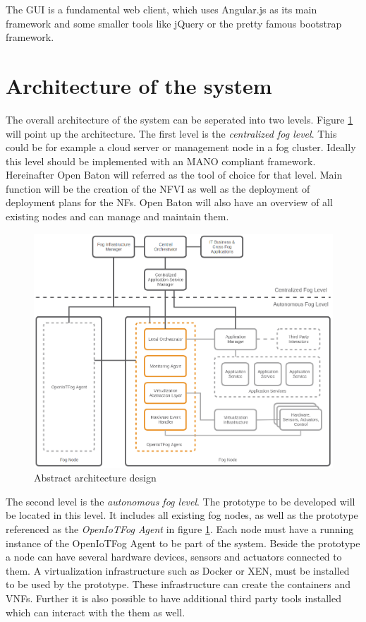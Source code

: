 The \ac{GUI} is a fundamental web client, which uses Angular.js as its main framework and some smaller tools like jQuery or the pretty famous bootstrap framework.

\section{Architecture of the system}
\doit

The overall architecture of the system can be seperated into two levels.
Figure \ref{fig:abstract_architecture_design} will point up the architecture.
The first level is the \textit{centralized fog level}.
This could be for example a cloud server or management node in a fog cluster.
Ideally this level should be implemented with an \ac{MANO} compliant framework.
Hereinafter Open Baton will referred as the tool of choice for that level.
Main function will be the creation of the \ac{NFVI} as well as the deployment of deployment plans for the \acp{NF}.
Open Baton will also have an overview of all existing nodes and can manage and maintain them.

\begin{figure}[H]
    \centering
    \includegraphics[width=\textwidth]{resources/images/initial_structure.png}
    \caption[Abstract architecture design]{Abstract architecture design}
    \label{fig:abstract_architecture_design}
\end{figure}

The second level is the \textit{autonomous fog level}.
The prototype to be developed will be located in this level.
It includes all existing fog nodes, as well as the prototype referenced as the \textit{OpenIoTFog Agent} in figure \ref{fig:abstract_architecture_design}.
Each node must have a running instance of the OpenIoTFog Agent to be part of the system.
Beside the prototype a node can have several hardware devices, sensors and actuators connected to them.
A virtualization infrastructure such as Docker or XEN, must be installed to be used by the prototype.
These infrastructure can create the containers and \acp{VNF}.
Further it is also possible to have additional third party tools installed which can interact with the them as well.

